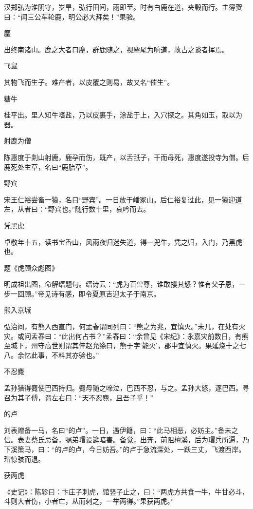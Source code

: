 \documentclass[a4paper,12pt,UTF8,twoside]{ctexbook}
\begin{document}
    汉郑弘为淮阴守，岁旱，弘行田间，雨即至。时有白鹿在道，夹毂而行。主簿贺曰：“闻三公车轮鹿，明公必大拜矣！”果验。
    
    麈
    
    出终南诸山。鹿之大者曰麈，群鹿随之，视麈尾为响道，故古之谈者挥焉。
    
    飞鼠
    
    其物飞而生子。难产者，以皮覆之则易，故又名“催生”。
    
    糖牛
    
    桂平出。里人知牛嗜盐，乃以皮裹手，涂盐于上，入穴探之。其角如玉，取以为器。
    
    射鹿为僧
    
    陈惠度于剡山射鹿，鹿孕而伤，既产，以舌舐子，干而母死，惠度遂投寺为僧。后鹿死处生草，名曰“鹿胎草”。
    
    野宾
    
    宋王仁裕尝畜一猿，名曰“野宾”。一日放于嶓冢山。后仁裕复过此，见一猿迎道左，从者曰：“野宾也。”随行数十里，哀吟而去。
    
    凭黑虎
    
    卓敬年十五，读书宝香山，风雨夜归迷失道，得一兕牛，凭之归，入门，乃黑虎也。
    
    题《虎顾众彪图》
    
    明成祖出图，命解缙题句。缙诗云：“虎为百兽尊，谁敢撄其怒？惟有父子恩，一步一回顾。”帝见诗有感，即令夏原吉迎太子于南京。
    
    熊入京城
    
    弘治间，有熊入西直门，何孟春谓同列曰：“熊之为兆，宜慎火。”未几，在处有火灾。或问孟春曰：“此出何占书？”孟春曰：“余曾见《宋纪》：永嘉灾前数日，有熊至城下，州守高世则谓其倅赵允绦曰，熊于字‘能火’，郡中宜慎火。果延烧十之七八。余忆此事，不料其亦验也。”
    
    不忍麑
    
    孟孙猎得麑使巴西持归。麑母随之啼泣，巴西不忍，与之。孟孙大怒，逐巴西。寻召为其子傅，谓左右曰：“天不忍麑，且吾子乎！”
    
    的卢
    
    刘表赠备一马，名曰“的卢”。一日，遇伊籍，曰：“此马相恶，必妨主。”备未之信。表妻蔡氏忌备，嘱弟瑁设筵暗害。备觉，出奔，前阻檀溪，后为瑁兵所逼，乃下溪策马，曰：“的卢的卢，今日妨吾。”的卢于急流深处，一跃三丈，飞渡西岸。瑁惊骇而退。
    
    获两虎
    
    《史记》：陈轸曰：卞庄子刺虎，馆竖子止之，曰：“两虎方共食一牛，牛甘必斗，斗则大者伤，小者亡，从而刺之，一举两得。”果获两虎。”
    
\end{document}
